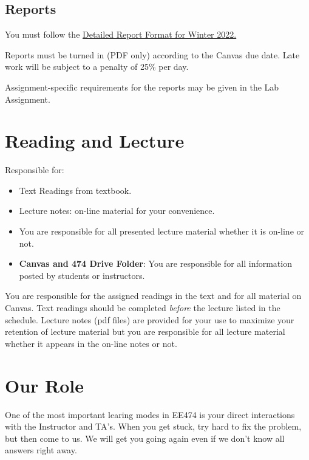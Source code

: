 \documentclass{article}	%
\begin{document}
    
\subsection{Reports}

You must follow the 
\href{https://docs.google.com/document/d/1ULLzhaaIIeD6ySu6mXbT2wZu7wzkd9dZKkvZofGXWs8/edit#heading=h.kn22uqjivvbw}
{Detailed Report Format for Winter 2022.}

Reports must be turned in (PDF only) according to the Canvas due date.
Late work will be subject to a penalty of 25\% per day. 

Assignment-specific requirements for the reports may be given in the Lab Assignment.

\section{Reading and Lecture}

Responsible for:
\begin{itemize}
        \item Text Readings from textbook.
        \item Lecture notes:  on-line material for your convenience.
        \item You are responsible for all presented lecture material whether it
        is on-line or not.
        \item {\bf Canvas and 474 Drive Folder}:
        You are responsible for all information posted by students or instructors.
\end{itemize}

You are responsible for the assigned readings in the text and for all
material on Canvas.    Text readings should
be completed {\it before} the lecture listed in the schedule.
Lecture notes (pdf files) are provided for your use to maximize your retention
 of lecture material but you are responsible for all lecture material whether
 it appears in the on-line notes or not.



\section{Our Role}
One of the most important learing modes in EE474 is your direct interactions
with the Instructor and TA's.
When you get stuck, try hard to fix the problem, but then come to us.
We will get you going again even if we don't know all answers right away.
\end{document}
